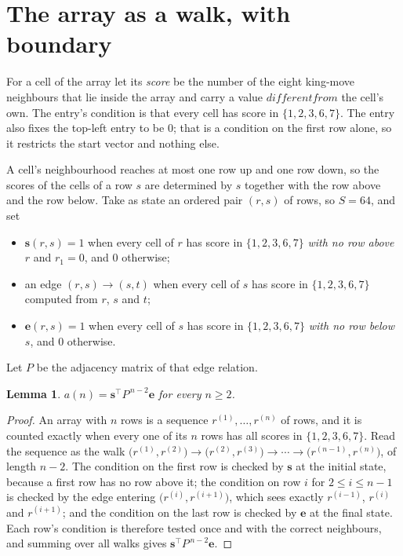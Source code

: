 \documentclass[11pt,a4paper]{article}
\theoremstyle{plain}
\newtheorem{lemma}[theorem]{Lemma}
\theoremstyle{definition}
\begin{document}
\section{The array as a walk, with boundary}

For a cell of the array let its \emph{score} be the number of the eight king-move neighbours that lie inside
the array and carry a value $different from$ the cell's own. The entry's condition is that every cell
has score in $\{1,2,3,6,7\}$. The entry also fixes the top-left entry to be $0$; that is a condition on the first row alone, so it restricts the start vector and nothing else.

A cell's neighbourhood reaches at most one row up and one row down, so the scores of the
cells of a row $s$ are determined by $s$ together with the row above and the row below.
Take as state an ordered pair $(r,s)$ of rows, so $S=64$, and set
\begin{itemize}
\item $\mathbf{s}(r,s)=1$ when every cell of $r$ has score in $\{1,2,3,6,7\}$ \emph{with no row
above $r$} and $r_1=0$, and $0$ otherwise;
\item an edge $(r,s)\to(s,t)$ when every cell of $s$ has score in $\{1,2,3,6,7\}$ computed from
$r$, $s$ and $t$;
\item $\mathbf{e}(r,s)=1$ when every cell of $s$ has score in $\{1,2,3,6,7\}$ \emph{with no row
below $s$}, and $0$ otherwise.
\end{itemize}
Let $P$ be the adjacency matrix of that edge relation.

\begin{lemma}\label{lem:walk}
$a(n)=\mathbf{s}^{\!\top}P^{\,n-2}\mathbf{e}$ for every $n\ge2$.
\end{lemma}

\begin{proof}
An array with $n$ rows is a sequence $r^{(1)},\dots,r^{(n)}$ of rows, and it is counted
exactly when every one of its $n$ rows has all scores in $\{1,2,3,6,7\}$. Read the sequence as the
walk $\bigl(r^{(1)},r^{(2)}\bigr)\to\bigl(r^{(2)},r^{(3)}\bigr)\to\cdots\to
\bigl(r^{(n-1)},r^{(n)}\bigr)$, of length $n-2$. The condition on the first row is
checked by $\mathbf{s}$ at the initial state, because a first row has no row above it; the
condition on row $i$ for $2\le i\le n-1$ is checked by the edge entering
$\bigl(r^{(i)},r^{(i+1)}\bigr)$, which sees exactly $r^{(i-1)}$, $r^{(i)}$ and
$r^{(i+1)}$; and the condition on the last row is checked by $\mathbf{e}$ at the final
state. Each row's condition is therefore tested once and with the correct neighbours, and
summing over all walks gives $\mathbf{s}^{\!\top}P^{\,n-2}\mathbf{e}$.
\end{proof}
\end{document}
